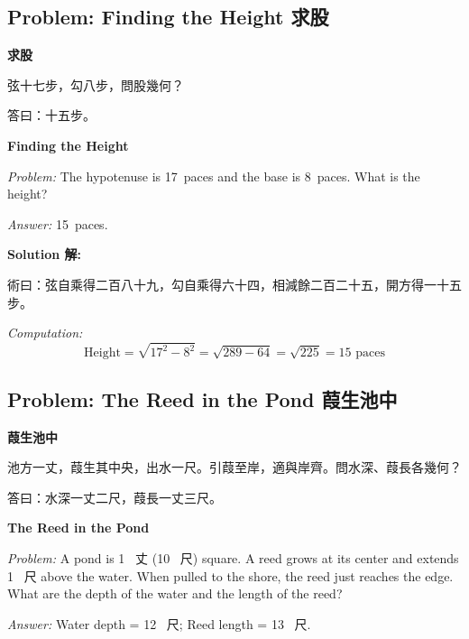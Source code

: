 \documentclass[11pt,a4paper]{article}
\newcommand{\zh}[1]{{\CJKfamily{\CJKrmdefault} #1}}
\newenvironment{chside}{%
  \begin{minipage}[t]{0.48\textwidth}%
  \setlength{\parindent}{1.5em}%
  \linespread{1.25}\selectfont%
  \small%
}{%
  \end{minipage}%
}
\newenvironment{enside}{%
  \hfill\begin{minipage}[t]{0.48\textwidth}%
  \setlength{\parindent}{1em}%
  \linespread{1.15}\selectfont%
  \small%
}{%
  \end{minipage}%
}
\newenvironment{solution}{%
  \par\medskip\noindent\textbf{\textcolor{notecolor}{Solution \zh{解}:}}\par\nopagebreak
  \small\setlength{\parindent}{1em}%
}{%
  \par\medskip%
}
\begin{document}
\subsection{Problem: Finding the Height \zh{求股}}

\noindent\begin{chside}
\noindent\textbf{求股}

\zh{弦十七步，勾八步，問股幾何？}

\medskip
\zh{答曰：十五步。}
\end{chside}%
\begin{enside}
\noindent\textbf{Finding the Height}

\textit{Problem:} The hypotenuse is 17~paces and the base is 8~paces. What is
the height?

\medskip
\textit{Answer:} 15~paces.
\end{enside}

\begin{solution}
\noindent\begin{chside}
\zh{術曰：弦自乘得二百八十九，勾自乘得六十四，相減餘二百二十五，開方得一十五步。}
\end{chside}%
\begin{enside}
\textit{Computation:}
\[
\text{Height} = \sqrt{17^2 - 8^2} = \sqrt{289 - 64} = \sqrt{225} = 15 \text{ paces}
\]
\end{enside}
\end{solution}

\subsection{Problem: The Reed in the Pond \zh{葭生池中}}

\noindent\begin{chside}
\noindent\textbf{葭生池中}

\zh{池方一丈，葭生其中央，出水一尺。引葭至岸，適與岸齊。問水深、葭長各幾何？}

\medskip
\zh{答曰：水深一丈二尺，葭長一丈三尺。}
\end{chside}%
\begin{enside}
\noindent\textbf{The Reed in the Pond}

\textit{Problem:} A pond is 1~\zh{丈} (10~\zh{尺}) square. A reed grows at its
center and extends 1~\zh{尺} above the water. When pulled to the shore, the
reed just reaches the edge. What are the depth of the water and the length
of the reed?

\medskip
\textit{Answer:} Water depth = 12~\zh{尺}; Reed length = 13~\zh{尺}.
\end{enside}
\end{document}
